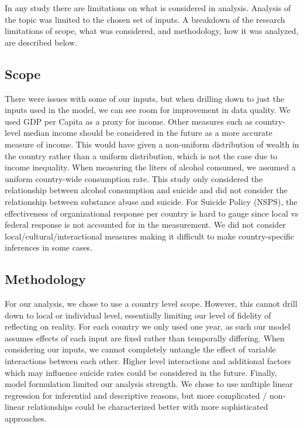 \documentclass[]{article}
\begin{document}
In any study there are limitations on what is considered in analysis.
Analysis of the topic was limited to the chosen set of inputs. A
breakdown of the research limitations of scope, what was considered, and
methodology, how it was analyzed, are described below.

\subsection{Scope}\label{scope}

There were issues with some of our inputs, but when drilling down to
just the inputs used in the model, we can see room for improvement in
data quality. We used GDP per Capita as a proxy for income. Other
measures such as country-level median income should be considered in the
future as a more accurate measure of income. This would have given a
non-uniform distribution of wealth in the country rather than a uniform
distribution, which is not the case due to income inequality. When
measuring the liters of alcohol consumed, we assumed a uniform
country-wide consumption rate. This study only considered the
relationship between alcohol consumption and suicide and did not
consider the relationship between substance abuse and suicide. For
Suicide Policy (NSPS), the effectiveness of organizational response per
country is hard to gauge since local vs federal response is not
accounted for in the measurement. We did not consider
local/cultural/interactional measures making it difficult to make
country-specific inferences in some cases.

\subsection{Methodology}\label{methodology}

For our analysis, we chose to use a country level scope. However, this
cannot drill down to local or individual level, essentially limiting our
level of fidelity of reflecting on reality. For each country we only
used one year, as such our model assumes effects of each input are fixed
rather than temporally differing. When considering our inputs, we cannot
completely untangle the effect of variable interactions between each
other. Higher level interactions and additional factors which may
influence suicide rates could be considered in the future. Finally,
model formulation limited our analysis strength. We chose to use
multiple linear regression for inferential and descriptive reasons, but
more complicated / non-linear relationships could be characterized
better with more sophisticated approaches.
\end{document}

